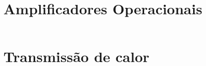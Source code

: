 \documentclass[a4paper, 12pt]{article}
\begin{document}
\section{Amplificadores Operacionais}

\[\]


\section{Transmissão de calor}
\end{document}
